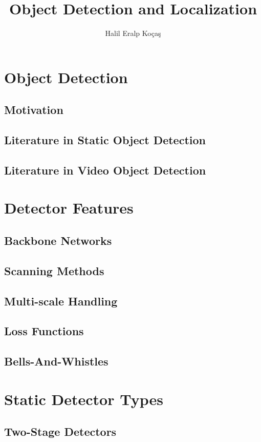 \documentclass{article}
\title{Object Detection and Localization}
\author{Halil Eralp Koçaş}
\begin{document}
\maketitle

\section{Object Detection}

\subsection{Motivation}
\subsection{Literature in Static Object Detection}
\subsection{Literature in Video Object Detection}

\section{Detector Features}

\subsection{Backbone Networks}
\subsection{Scanning Methods}
\subsection{Multi-scale Handling}
\subsection{Loss Functions}
\subsection{Bells-And-Whistles}

\section{Static Detector Types}
\subsection{Two-Stage Detectors}
\end{document}
